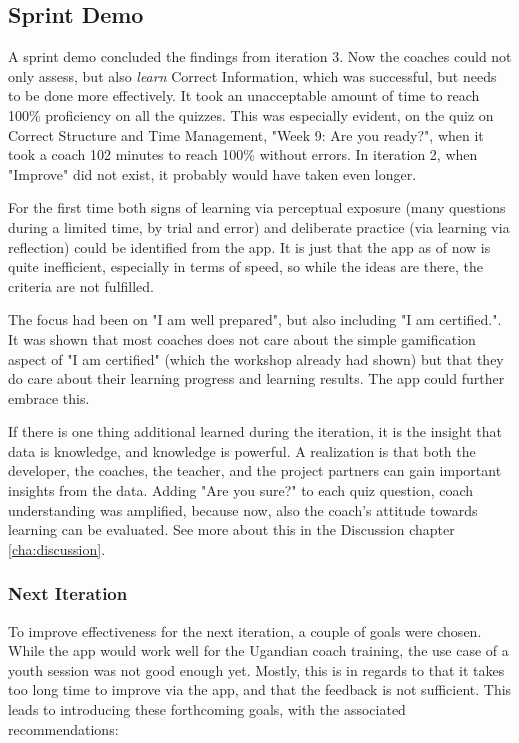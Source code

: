 \subsection{Sprint Demo}

  A sprint demo concluded the findings from iteration 3. Now the coaches could not only assess, but also \textit{learn} Correct Information, which was successful, but needs to be done more effectively. It took an unacceptable amount of time to reach 100\% proficiency on all the quizzes. This was especially evident, on the quiz on Correct Structure and Time Management, "Week 9: Are you ready?", when it took a coach 102 minutes to reach 100\% without errors. In iteration 2, when "Improve" did not exist, it probably would have taken even longer.

  For the first time both signs of learning via perceptual exposure (many questions during a limited time, by trial and error) and deliberate practice (via learning via reflection) could be identified from the app. It is just that the app as of now is quite inefficient, especially in terms of speed, so while the ideas are there, the criteria are not fulfilled.

  The focus had been on "I am well prepared", but also including "I am certified.". It was shown that most coaches does not care about the simple gamification aspect of "I am certified" (which the workshop already had shown) but that they do care about their learning progress and learning results. The app could further embrace this.

  If there is one thing additional learned during the iteration, it is the insight that data is knowledge, and knowledge is powerful. A realization is that both the developer, the coaches, the teacher, and the project partners can gain important insights from the data. Adding "Are you sure?" to each quiz question, coach understanding was amplified, because now, also the coach's attitude towards learning can be evaluated. See more about this in the Discussion chapter \ref{cha:discussion}.

  \subsubsection{Next Iteration}
  To improve effectiveness for the next iteration, a couple of goals were chosen. While the app would work well for the Ugandian coach training, the use case of a youth session was not good enough yet. Mostly, this is in regards to that it takes too long time to improve via the app, and that the feedback is not sufficient. This leads to introducing these forthcoming goals, with the associated recommendations:

